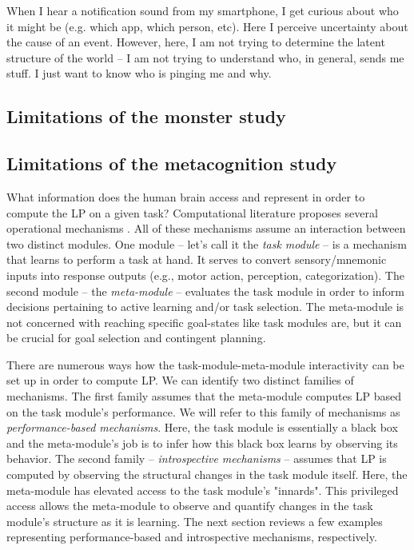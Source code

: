     When I hear a notification sound from my smartphone, I get curious about who it might be (e.g. which app, which person, etc). Here I perceive uncertainty about the cause of an event. However, here, I am not trying to determine the latent structure of the world -- I am not trying to understand who, in general, sends me stuff. I just want to know who is pinging me and why.

\subsection{Limitations of the monster study}

    

\subsection{Limitations of the metacognition study}

What information does the human brain access and represent in order to compute the \ac{LP} on a given task? Computational literature proposes several operational mechanisms \parencite{oudeyer_what_2007,graves_automated_2017,twomey_curiosity-based_2018,linke_adapting_2020}. All of these mechanisms assume an interaction between two distinct modules. One module -- let's call it the \emph{task module} -- is a mechanism that learns to perform a task at hand. It serves to convert sensory/mnemonic inputs into response outputs (e.g., motor action, perception, categorization). The second module -- the \emph{meta-module} -- evaluates the task module in order to inform decisions pertaining to active learning and/or task selection. The meta-module is not concerned with reaching specific goal-states like task modules are, but it can be crucial for goal selection and contingent planning. 

There are numerous ways how the task-module-meta-module interactivity can be set up in order to compute \ac{LP}. We can identify two distinct families of mechanisms. The first family assumes that the meta-module computes \ac{LP} based on the task module's performance. We will refer to this family of mechanisms as \emph{performance-based mechanisms}. Here, the task module is essentially a black box and the meta-module's job is to infer how this black box learns by observing its behavior. The second family -- \emph{introspective mechanisms} -- assumes that \ac{LP} is computed by observing the structural changes in the task module itself. Here, the meta-module has elevated access to the task module's "innards". This privileged access allows the meta-module to observe and quantify changes in the task module's structure as it is learning. The next section reviews a few examples representing performance-based and introspective mechanisms, respectively.

